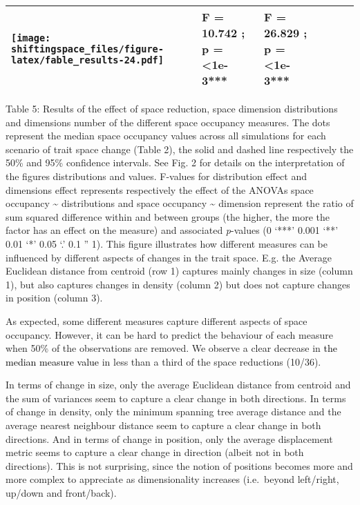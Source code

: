 \documentclass[]{article}
\begin{document}
\begin{longtable}[]{@{}llllll@{}}
\begin{minipage}[t]{0.13\columnwidth}
\texttt{[image: shiftingspace\_files/figure-latex/fable\_results-24.pdf]}\strut
\end{minipage} & \begin{minipage}[t]{0.17\columnwidth}\raggedright\strut
F = 10.742 ; p = \textless{}1e-3***\strut
\end{minipage} & \begin{minipage}[t]{0.16\columnwidth}\raggedright\strut
F = 26.829 ; p = \textless{}1e-3***\strut
\end{minipage}\tabularnewline
\bottomrule
\end{longtable}

Table 5: Results of the effect of space reduction, space dimension
distributions and dimensions number of the different space occupancy
measures. The dots represent the median space occupancy values across
all simulations for each scenario of trait space change (Table 2), the
solid and dashed line respectively the 50\% and 95\% confidence
intervals. See Fig. 2 for details on the interpretation of the figures
distributions and values. F-values for distribution effect and
dimensions effect represents respectively the effect of the ANOVAs space
occupancy \textasciitilde{} distributions and space occupancy
\textasciitilde{} dimension represent the ratio of sum squared
difference within and between groups (the higher, the more the factor
has an effect on the measure) and associated \emph{p}-values (0 `***'
0.001 `**' 0.01 `*' 0.05 `.' 0.1 '' 1). This figure illustrates how
different measures can be influenced by different aspects of changes in
the trait space. E.g. the Average Euclidean distance from centroid (row
1) captures mainly changes in size (column 1), but also captures changes
in density (column 2) but does not capture changes in position (column
3).

\renewcommand\baselinestretch{1.6}\selectfont

As expected, some different measures capture different aspects of space
occupancy. However, it can be hard to predict the behaviour of each
measure when 50\% of the observations are removed. We observe a clear
decrease in \textcolor{black}{the median measure
value} in less than a third of the space reductions (10/36).

In terms of change in size, only the average Euclidean distance from
centroid and the sum of variances seem to capture a clear change in both
directions. In terms of change in density, only the minimum spanning
tree average distance and the average nearest neighbour distance seem to
capture a clear change in both directions. And in terms of change in
position, only the average displacement metric seems to capture a clear
change in direction (albeit not in both directions). This is not
surprising, since the notion of positions becomes more and more complex
to appreciate as dimensionality increases (i.e.~beyond left/right,
up/down and front/back).
\end{document}
